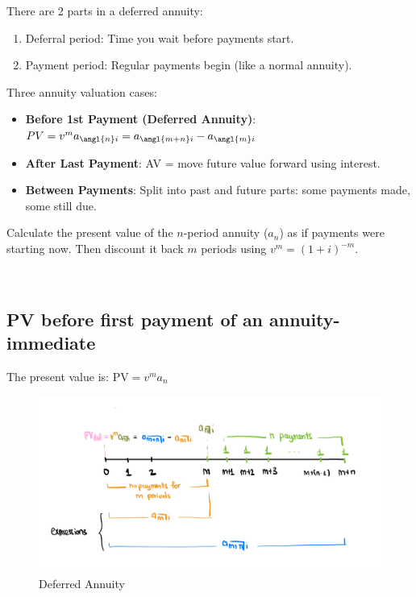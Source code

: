 \begin{comments}
    There are 2 parts in a deferred annuity: 
    \begin{enumerate}
        \item Deferral period: Time you wait before payments start.
        \item Payment period: Regular payments begin (like a normal annuity).
    \end{enumerate} 
    \break

    Three annuity valuation cases: 
    \begin{itemize}
        \item \textbf{Before 1st Payment (Deferred Annuity)}: $PV=v^m a_{\angl{n}i} = a_{\angl{m+n}i} - a_{\angl{m}i}$
        \item \textbf{After Last Payment}: AV = move future value forward using interest.
        \item \textbf{Between Payments}: Split into past and future parts: some payments made, some still due.
    \end{itemize}
\end{comments}
\begin{comments}
     Calculate the present value of the \( n \)-period annuity (\( a_n \)) as if payments were starting now. Then discount it back \( m \) periods using \( v^m = (1 + i)^{-m} \).
\end{comments} \\

\subsection{PV before first payment of an annuity-immediate}

\begin{theorem}
The present value is:
$\text{PV} = v^m a_n$
\end{theorem}


\begin{figure}
    \centering
    \includegraphics[width=1.0\linewidth]{deferred_annuity.JPG}
    \caption{Deferred Annuity}
    \label{fig:enter-label}
\end{figure}



